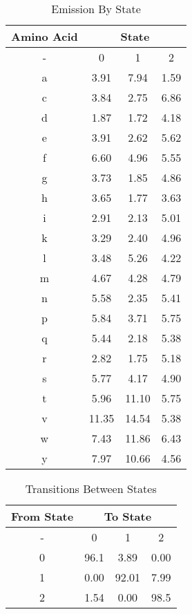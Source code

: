 \documentclass[a4paper,11pt]{article}
\begin{document}
\begin{table}[!hbp]
    \centering
    \caption{Emission By State}
    \vspace{0.5cm}
    \begin{tabular}{|c|c  c  c|}
        \hline
        \textbf{Amino Acid} & \multicolumn{3}{|c|}{\textbf{State}} \\
        \hline
        -  &  0 & 1 & 2 \\
        \hline
        a & 3.91 & 7.94 & 1.59 \\
        \hline
        c & 3.84 & 2.75 & 6.86 \\
        \hline
        d & 1.87 & 1.72 & 4.18 \\
        \hline
        e & 3.91 & 2.62 & 5.62 \\
        \hline
        f & 6.60 & 4.96 & 5.55 \\
        \hline
        g & 3.73 & 1.85 & 4.86 \\
        \hline
        h & 3.65 & 1.77 & 3.63 \\
        \hline
        i & 2.91 & 2.13 & 5.01 \\
        \hline
        k & 3.29 & 2.40 & 4.96 \\
        \hline
        l & 3.48 & 5.26 & 4.22 \\
        \hline
        m & 4.67 & 4.28 & 4.79 \\
        \hline
        n & 5.58 & 2.35 & 5.41 \\
        \hline
        p & 5.84 & 3.71 & 5.75 \\
        \hline
        q & 5.44 & 2.18 & 5.38 \\
        \hline
        r & 2.82 & 1.75 & 5.18 \\
        \hline
        s & 5.77 & 4.17 & 4.90 \\
        \hline
        t & 5.96 & 11.10 & 5.75 \\
        \hline
        v & 11.35 & 14.54 & 5.38 \\
        \hline
        w & 7.43 & 11.86 & 6.43 \\
        \hline
        y & 7.97 & 10.66 & 4.56 \\
        \hline
    \end{tabular}
    \label{emissions}
\end{table}


\begin{table}[!hbp]
    \centering
    \caption{Transitions Between States }
    \vspace{0.5cm}
    \begin{tabular}{|c|c c c|}
        \hline
        \textbf{From State} & \multicolumn{3}{c|}{\textbf{To State}} \\
        \hline
        - & 0 & 1 & 2 \\
        \hline
        0 & 96.1 & 3.89 & 0.00 \\
        1 & 0.00 & 92.01 & 7.99 \\
        2 & 1.54 & 0.00 & 98.5 \\
        \hline
    \end{tabular}
    \label{transitions}
\end{table}
\end{document}
